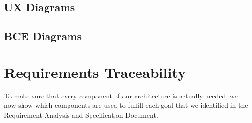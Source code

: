 \documentclass[english]{article}
\begin{document}
\subsection{UX Diagrams}



\subsection{BCE Diagrams}


\newpage

\section{Requirements Traceability}
To make sure that every component of our architecture is actually needed, we now show which components are used to fulfill each goal that we identified in the Requirement Analysis and Specification Document.
\end{document}
